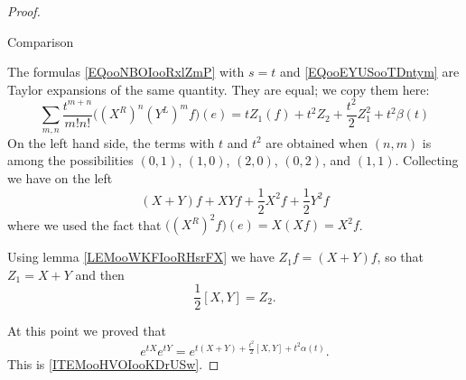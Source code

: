 \begin{proof}
\begin{subproof}
        \item[Comparison]

            The formulas \eqref{EQooNBOIooRxlZmP} with \( s=t\) and \eqref{EQooEYUSooTDntym} are Taylor expansions of the same quantity. They are equal; we copy them here:
            \begin{equation}
                \sum_{m,n}\frac{ t^{m+n} }{ m!n! }\big( (X^R)^n(Y^L)^mf \big)(e)=tZ_1(f)+t^2 Z_2 +\frac{ t^2 }{2}Z_1^2 +t^2\beta(t)
            \end{equation}
            On the left hand side, the terms with \( t\) and \( t^2\) are obtained when \( (n,m)\) is among the possibilities $(0,1)$, $(1,0)$, $(2,0)$, $(0,2)$, and $(1,1)$. Collecting we have on the left
            \begin{equation}
                (X+Y)f+XYf+\frac{ 1 }{2}X^2f+\frac{ 1 }{2}Y^2f
            \end{equation}
            where we used the fact that \( \big( (X^R)^2f \big)(e)=X(Xf)=X^2f\).

            Using lemma \ref{LEMooWKFIooRHsrFX} we have \( Z_1f=(X+Y)f\), so that \( Z_1=X+Y\) and then
            \begin{equation}
                \frac{ 1 }{2}[X,Y]=Z_2.
            \end{equation}
    \end{subproof}
    At this point we proved that
    \begin{equation}
        e^{tX} e^{tY}= e^{t(X+Y)+\frac{ t^2 }{2}[X,Y]+t^2\alpha(t)}.
    \end{equation}
    This is \ref{ITEMooHVOIooKDrUSw}.


\end{proof}

